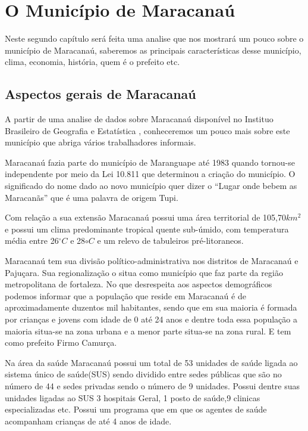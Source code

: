 \chapter{O Município de Maracanaú}

Neste segundo capítulo será feita uma analise que nos mostrará um pouco sobre o município de Maracanaú, saberemos as principais características desse município, clima, economia, história, quem é o prefeito etc.

\section{Aspectos gerais de Maracanaú}

A partir de uma analise de dados sobre Maracanaú disponível no Instituo Brasileiro de Geografia e Estatística \cite{demografico2000resultados}, conheceremos um pouco mais sobre este município que abriga vários trabalhadores informais. 

Maracanaú fazia parte do município de Maranguape até 1983 quando tornou-se independente por meio da Lei 10.811 que determinou a criação do município. O significado do nome dado ao novo município quer dizer o ``Lugar onde bebem as Maracanãs'' que é uma palavra de origem Tupi. 

Com relação a sua extensão Maracanaú possui uma área territorial de 105,70$km^2$ e possui um clima predominante tropical quente sub-úmido, com temperatura média entre 26$^{\circ}C$ e 28${\circ}C$ e um relevo de tabuleiros pré-litoraneos.

Maracanaú tem sua divisão político-administrativa nos distritos de Maracanaú e Pajuçara. Sua regionalização o situa como município que faz parte da região metropolitana de fortaleza. No que desrespeita aos aspectos demográficos podemos informar que a população que reside em Maracanaú é de aproximadamente duzentos mil habitantes, sendo que em sua maioria é formada por crianças e jovens com idade de 0 até 24 anos e dentre toda essa população a maioria situa-se na zona urbana e a menor parte situa-se na zona rural. E tem como prefeito Firmo Camurça.

Na área da saúde Maracanaú possui um total de 53 unidades de saúde ligada ao sistema único de saúde(SUS) sendo dividido entre sedes públicas que são no número de 44 e sedes privadas sendo o número de 9 unidades. Possui dentre suas unidades ligadas ao SUS 3 hospitais Geral, 1 posto de saúde,9 clinicas especializadas etc. Possui um programa que em que os agentes de saúde acompanham crianças de até 4 anos de idade.

